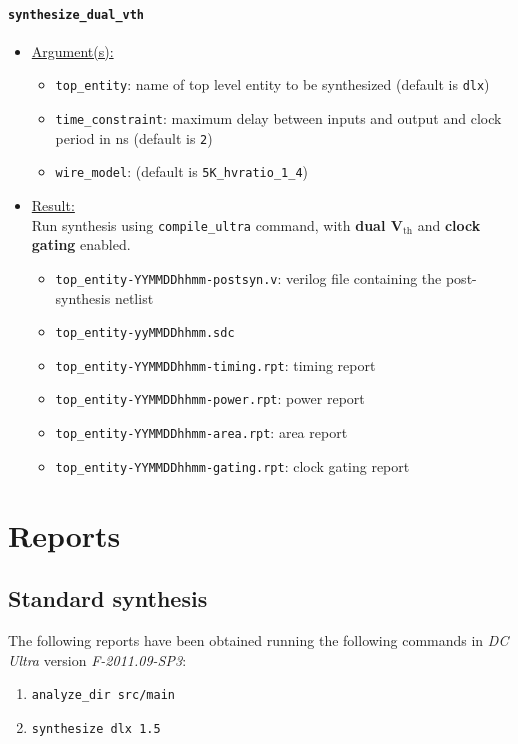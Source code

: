 \paragraph{\texttt{synthesize\_dual\_vth}}
\begin{itemize}
	\item \underline{Argument(s):}
		\begin{itemize}
			\item \texttt{top\_entity}: name of top level entity to
				be synthesized (default is \texttt{dlx})
			\item \texttt{time\_constraint}: maximum delay between
				inputs and output and clock period in ns
				(default is \texttt{2})
			\item \texttt{wire\_model}: (default is \texttt{5K\_hvratio\_1\_4})
		\end{itemize}
	\item \underline{Result:} \\
		Run synthesis using \texttt{compile\_ultra} command, with
		\textbf{dual V$_{\text{th}}$} and \textbf{clock gating} enabled.
		\begin{itemize}
			\item \texttt{top\_entity-YYMMDDhhmm-postsyn.v}: verilog
				file containing the post-synthesis netlist
			\item \texttt{top\_entity-yyMMDDhhmm.sdc}
			\item \texttt{top\_entity-YYMMDDhhmm-timing.rpt}: timing
				report
			\item \texttt{top\_entity-YYMMDDhhmm-power.rpt}: power
				report
			\item \texttt{top\_entity-YYMMDDhhmm-area.rpt}: area
				report
			\item \texttt{top\_entity-YYMMDDhhmm-gating.rpt}: clock
				gating report
		\end{itemize}
\end{itemize}

\section{Reports}
\subsection{Standard synthesis}
\label{subsec:std_syn}
The following reports have been obtained running the following commands in
\textit{DC Ultra} version \textit{F-2011.09-SP3}:
\begin{enumerate}
	\item \texttt{analyze\_dir src/main}
	\item \texttt{synthesize dlx 1.5}
\end{enumerate}

